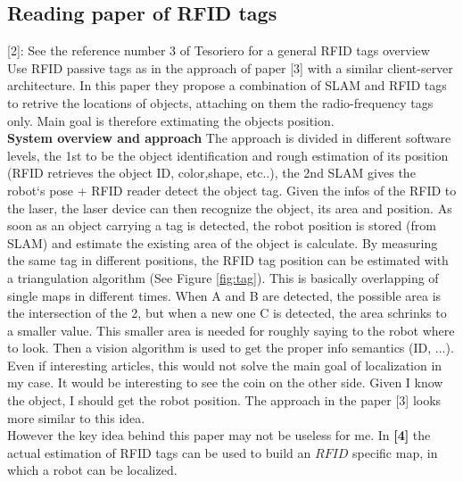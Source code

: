 \documentclass[11pt,a4paper]{article}
\begin{document}
\subsection{Reading paper of RFID tags}
[2]: See the reference number 3 of Tesoriero for a general RFID tags overview \\
Use RFID passive tags as in the approach of paper [3] with a similar client-server architecture. In this paper they propose a combination of SLAM and RFID tags to retrive the locations of objects, attaching on them the radio-frequency tags only. Main goal is therefore extimating the objects position.\\
\textbf{System overview and approach} The approach is divided in different software levels, the 1st to be the object identification and rough estimation of its position (RFID retrieves the object ID, color,shape, etc..), the 2nd SLAM gives the robot`s pose + RFID reader detect the object tag. Given the infos of the RFID to the laser, the laser device can then recognize the object, its area and position. As soon as an object carrying a tag is detected, the robot position is stored (from SLAM) and estimate the existing area of the object is calculate. By measuring the same tag in different positions, the RFID tag position can be estimated with a triangulation algorithm (See Figure \ref{fig:tag}). This is basically overlapping of single maps in different times. When A and B are detected, the possible area is the intersection of the 2, but when a new one C is detected, the area schrinks to a smaller value. This smaller area is needed for roughly saying to the robot where to look. Then a vision algorithm is used to get the proper info semantics (ID, ...). \\
Even if interesting articles, this would not solve the main goal of localization in my case. It would be interesting to see the coin on the other side. Given I know the object, I should get the robot position. The approach in the paper [3] looks more similar to this idea. \\
However the key idea behind this paper may not be useless for me. In \textbf{[4]} the actual estimation of RFID tags can be used to build an $RFID$ specific map, in which a robot can be localized. \\
\end{document}
